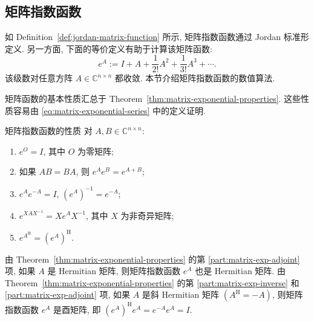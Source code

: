 \subsection{{矩阵指数函数}}\label{sec:matrix-exponential-function}

{如 Definition~\ref{def:jordan-matrix-function} 所示, 矩阵指数函数通过 Jordan 标准形定义. 另一方面, 下面的等价定义有助于计算该矩阵函数:}
\begin{equation}\label{eq:matrix-exponential-series}e^A:=I+A+\frac{1}{2!}A^2+\frac{1}{3!}A^3+\cdots.\end{equation}
{该级数对任意方阵 $A\in\mathbb{C}^{n\times n}$ 都收敛. 本节介绍矩阵指数函数的数值算法.}

{矩阵函数的基本性质汇总于 Theorem~\ref{thm:matrix-exponential-properties}. 这些性质容易由 \eqref{eq:matrix-exponential-series} 中的定义证明.}

\begin{Theorem}{{矩阵指数函数的性质}}\label{thm:matrix-exponential-properties}
{对 $A,B\in\mathbb{C}^{n\times n}$:}
\begin{enumerate}[label=(\arabic*)]
\item\label{part:matrix-exp-zero} {$e^O=I$, 其中 $O$ 为零矩阵;}
\item\label{part:matrix-exp-commuting-sum} {如果 $AB=BA$, 则 $e^Ae^B=e^{A+B}$;}
\item\label{part:matrix-exp-inverse} $e^Ae^{-A}=I$, $(e^A)^{-1}=e^{-A}$;
\item\label{part:matrix-exp-similarity} {$e^{XAX^{-1}}=Xe^AX^{-1}$, 其中 $X$ 为非奇异矩阵;}
\item\label{part:matrix-exp-adjoint} $e^{A^{\mathrm H}}=(e^A)^{\mathrm H}$.
\end{enumerate}
\end{Theorem}

{由 Theorem~\ref{thm:matrix-exponential-properties} 的第 \ref{part:matrix-exp-adjoint} 项, 如果 $A$ 是 Hermitian 矩阵, 则矩阵指数函数 $e^A$ 也是 Hermitian 矩阵. 由 Theorem~\ref{thm:matrix-exponential-properties} 的第 \ref{part:matrix-exp-inverse} 和 \ref{part:matrix-exp-adjoint} 项, 如果 $A$ 是斜 Hermitian 矩阵 $(A^{\mathrm H}=-A)$, 则矩阵指数函数 $e^A$ 是酉矩阵, 即 $(e^A)^{\mathrm H}e^A=e^{-A}e^A=I$.}

